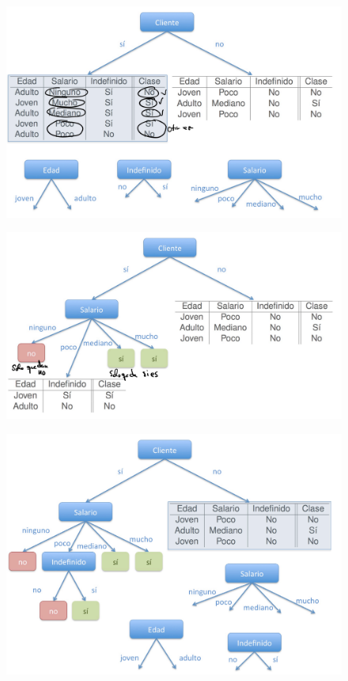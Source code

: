\documentclass[12pt]{report} %
\begin{document}
\begin{figure}[H]
	{\includegraphics[scale=.2]{Untitled 6.png}}
\end{figure}
\begin{figure}[H]
	{\includegraphics[scale=.2]{Untitled 7.png}}
\end{figure}
\begin{figure}[H]
	{\includegraphics[scale=.2]{Untitled 8.png}}
\end{figure}
\end{document}
